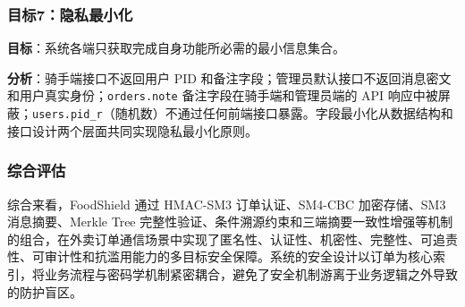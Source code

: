 \subsubsection*{目标7：隐私最小化}

\textbf{目标}：系统各端只获取完成自身功能所必需的最小信息集合。

\textbf{分析}：骑手端接口不返回用户 PID 和备注字段；管理员默认接口不返回消息密文和用户真实身份；\texttt{orders.note} 备注字段在骑手端和管理员端的 API 响应中被屏蔽；\texttt{users.pid\_r}（随机数）不通过任何前端接口暴露。字段最小化从数据结构和接口设计两个层面共同实现隐私最小化原则。

\subsubsection*{综合评估}

综合来看，FoodShield 通过 HMAC-SM3 订单认证、SM4-CBC 加密存储、SM3 消息摘要、Merkle Tree 完整性验证、条件溯源约束和三端摘要一致性增强等机制的组合，在外卖订单通信场景中实现了匿名性、认证性、机密性、完整性、可追责性、可审计性和抗滥用能力的多目标安全保障。系统的安全设计以订单为核心索引，将业务流程与密码学机制紧密耦合，避免了安全机制游离于业务逻辑之外导致的防护盲区。

